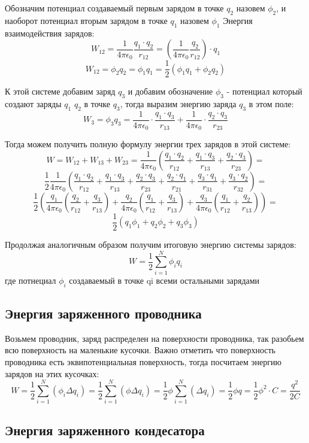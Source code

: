 \documentclass[../main.tex]{subfiles}
\begin{document}
Обозначим потенциал создаваемый первым зарядом в точке $q_2$ назовем $\phi_2$, и наоборот потенциал вторым зарядом в точке $q_1$ назовем $\phi_1$
Энергия взаимодействия зарядов:
\[W_{12} = \frac{1}{4 \pi \epsilon_0} \frac{q_1 \cdot q_2}{r_{12}} = (\frac{1}{4 \pi \epsilon_0} \frac{q_2}{r_{12}}) \cdot q_1\]
\[W_{12} = \phi_2 q_2 = \phi_1 q_1 = \frac{1}{2} (\phi_1 q_1 + \phi_2 q_2)\]

К этой системе добавим заряд $q_3$ и добавим обозначение $\phi_3$ - потенциал который создают заряды $q_1$ $q_2$ в точке $q_3$,
тогда выразим энергию заряда $q_3$ в этом поле:
\[W_3 = \phi_3 q_3 = \frac{1}{4 \pi \epsilon_0} \cdot \frac{q_1 \cdot q_3}{r_{13}} + \frac{1}{4 \pi \epsilon_0} \cdot \frac{q_2 \cdot q_3}{r_{23}}\]

Тогда можем получить полную формулу энергии трех зарядов в этой системе:
\[W = W_{12} + W_{13} + W_{23} = \frac{1}{4 \pi \epsilon_0} (\frac{q_1 \cdot q_2}{r_{12}} + \frac{q_1 \cdot q_3}{r_{13}}+ \frac{q_2 \cdot q_3}{r_{23}}) = \]
\[ \frac{1}{2}\frac{1}{4 \pi \epsilon_0}(\frac{q_1 \cdot q_2}{r_{12}} + \frac{q_1 \cdot q_3}{r_{13}}+ \frac{q_2 \cdot q_3}{r_{23}} + \frac{q_2 \cdot q_1}{r_{21}} + \frac{q_3 \cdot q_1}{r_{31}}+ \frac{q_3 \cdot q_2}{r_{32}}) = \]
\[ \frac{1}{2}(\frac{q_1}{4 \pi \epsilon_0}(\frac{q_2}{r_{12}} + \frac{q_3}{r_{13}}) + \frac{q_2}{4 \pi \epsilon_0}(\frac{q_1}{r_{12}} + \frac{q_3}{r_{13}}) + \frac{q_3}{4 \pi \epsilon_0}(\frac{q_1}{r_{12}} + \frac{q_2}{r_{13}}) ) = \]
\[ \frac{1}{2} (q_1 \phi_1 + q_2 \phi_2  + q_3 \phi_3) \]

Продолжая аналогичным образом получим итоговую энергию системы зарядов:
\[W = \frac{1}{2} \sum_{i=1}^{N} \phi_i q_i\]
где потнециал $\phi_i$ создаваемый в точке qi всеми остальными зарядами

\subsection{Энергия заряженного проводника}
Возьмем проводник, заряд распределен на поверхности проводника, так разобьем всю поверхность на маленькие кусочки.
Важно отметить что поверхность проводника есть эквипотенциальная поверхность, тогда посчитаем энергию зарядов на этих кусочках:
\[W = \frac{1}{2} \sum_{i=1}^{N} (\phi_i \Delta q_i) = \frac{1}{2} \sum_{i=1}^{N} (\phi \Delta q_i) =
    \frac{1}{2} \phi \sum_{i=1}^{N} (\Delta q_i) = \frac{1}{2} \phi q = \frac{1}{2} \phi^2 \cdot C = \frac{q^2}{2C}
\]
\subsection{Энергия заряженного кондесатора}
\end{document}
